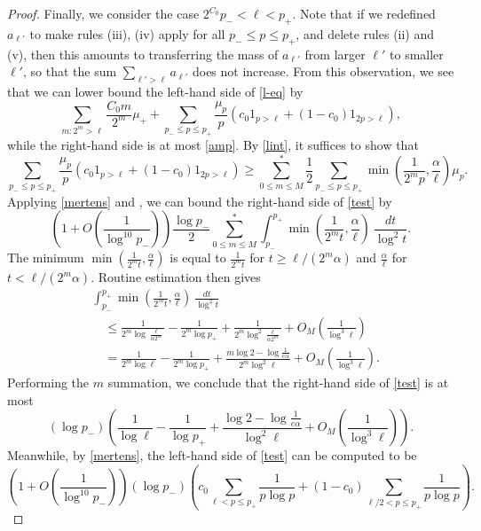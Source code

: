 \documentclass[10pt,a4paper,reqno]{amsart}
\numberwithin{equation}{section}
\theoremstyle{plain}
\theoremstyle{definition}
\begin{document}
\begin{proof}
Finally, we consider the case $2^{C_0} p_- < \ell < p_+$.
Note that if we redefined $a_{\ell'}$ to make rules (iii), (iv) apply for all $p_- \leq p \leq p_+$, and delete rules (ii) and (v), then this amounts to transferring the mass of $a_{\ell'}$ from larger $\ell'$ to smaller $\ell'$, so that the sum $\sum_{\ell' > \ell} a_{\ell'}$ does not increase.  From this observation, we see that we can lower bound the left-hand side of \eqref{l-eq} by
$$
\sum_{m: 2^m > \ell} \frac{C_0 m}{2^m} \mu_+ + \sum_{p_- \leq p \leq p_+} \frac{\mu_p}{p} \left( c_0 1_{p>\ell} + (1-c_0) 1_{2p>\ell}\right),
$$
while the right-hand side is at most \eqref{amp}.  By \eqref{lint}, it suffices to show that
\begin{equation}\label{test}
\sum_{p_- \leq p \leq p_+} \frac{\mu_p}{p} \left( c_0 1_{p>\ell} + (1-c_0) 1_{2p>\ell}\right)
\geq
\sum_{0 \leq m \leq M}^* \frac{1}{2} \sum_{p_- \leq p \leq p_+} \min\left(\frac{1}{2^mp}, \frac{\alpha}{\ell}\right) \mu_p.
\end{equation}
Applying \eqref{mertens} and , we can bound the right-hand side of \eqref{test} by
$$ \left( 1 + O\left(\frac{1}{\log^{10} p_-}\right)\right) \frac{\log p_-}{2} \sum_{0 \leq m \leq M}^* \int_{p_-}^{p_+} \min\left(\frac{1}{2^m t}, \frac{\alpha}{\ell}\right)\ \frac{dt}{\log^2 t}.$$
The minimum $\min(\frac{1}{2^m t}, \frac{\alpha}{\ell})$ is equal to $\frac{1}{2^m t}$ for $t \geq \ell/(2^m \alpha)$ and $\frac{\alpha}{\ell}$ for $t < \ell/(2^m \alpha)$.  Routine estimation then gives
\begin{align*}
&\int_{p_-}^{p_+} \min(\frac{1}{2^m t}, \frac{\alpha}{\ell})\ \frac{dt}{\log^2 t}\\
&\quad \leq \frac{1}{2^m \log \frac{\ell}{\alpha 2^m}} - \frac{1}{2^m \log p_+} + \frac{1}{2^m \log^2 \frac{\ell}{\alpha 2^m}} + O_M\left( \frac{1}{\log^3 \ell}\right) \\
&\quad =  \frac{1}{2^m \log \ell} - \frac{1}{2^m \log p_+} + \frac{m \log 2 - \log \frac{1}{e\alpha}}{2^m \log^2 \ell} + O_M\left( \frac{1}{\log^3 \ell}\right).
\end{align*}
Performing the $m$ summation, we conclude that the right-hand side of \eqref{test} is at most
$$ (\log p_-) \left(\frac{1}{\log \ell} - \frac{1}{\log p_+} + \frac{\log 2 - \log \frac{1}{e\alpha}}{\log^2 \ell} + O_M\left( \frac{1}{\log^3 \ell}\right) \right).$$
Meanwhile, by \eqref{mertens}, the left-hand side of \eqref{test} can be computed to be
$$
\left( 1 + O\left(\frac{1}{\log^{10} p_-}\right)\right)
(\log p_-) \left( c_0 \sum_{\ell < p \leq p_+} \frac{1}{p \log p} + (1-c_0) \sum_{\ell/2 < p \leq p_+} \frac{1}{p \log p} \right).$$

\end{proof}
\end{document}

